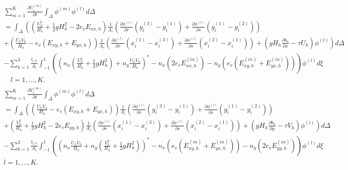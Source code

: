 \documentclass[11pt]{article}
\begin{document}
{\footnotesize
\begin{multline}
\displaystyle\sum_{m=1}^K\frac{\partial U_i^{(m)}}{\partial t}\int_{\Delta}\phi^{(m)}\phi^{(l)} d\Delta \\ = \int_{\Delta}\left(\left(\frac{U_h^2}{H_h} + \frac{1}{2}gH_h^2 - 2e_vE_{xx,h}\right) \frac{1}{A_i}\left(\frac{\partial \phi^{(l)}}{\partial r}\left(y_i^{(3)}-y_i^{(1)}\right) + \frac{\partial \phi^{(l)}}{\partial s}\left(y_i^{(1)}-y_i^{(2)}\right) \right) \right. \\  \left. + \left(\frac{U_hV_h}{H_h} - e_v\left(E_{xy,h} + E_{yx,h}\right) \right) \frac{1}{A_i}\left(\frac{\partial \phi^{(l)}}{\partial r}\left(x_i^{(1)}-x_i^{(3)}\right) + \frac{\partial \phi^{(l)}}{\partial s}\left(x_i^{(2)}-x_i^{(1)}\right) \right) +\left(gH_h\frac{\partial b_h}{\partial x} - \tau U_h \right)\phi^{(l)}\right)d\Delta \\ - \displaystyle\sum_{k=1}^3 \frac{l_{i,k}}{A_i}\int_{-1}^1 \left( \left(n_x\left(\frac{U_h^2}{H_h} + \frac{1}{2}gH_h^2 \right)+ n_y\frac{U_hV_h}{H_h}\right)^*-n_x\left(2e_vE_{xx,h}^{(in)}\right) -n_y\left(e_v\left( E_{xy,h}^{(in)} + E_{yx,h}^{(in)}\right) \right) \right)\phi^{(l)} d\xi   \\ \quad l = 1,\ldots,K.
\end{multline}}
{\footnotesize
\begin{multline}
\displaystyle\sum_{m=1}^K\frac{\partial V_i^{(m)}}{\partial t}\int_{\Delta}\phi^{(m)}\phi^{(l)} d\Delta \\ = \int_{\Delta}\left(\left(\frac{U_hV_h}{H_h}-e_v\left(E_{xy,h} + E_{yx,h} \right)\right) \frac{1}{A_i}\left(\frac{\partial \phi^{(l)}}{\partial r}\left(y_i^{(3)}-y_i^{(1)}\right) + \frac{\partial \phi^{(l)}}{\partial s}\left(y_i^{(1)}-y_i^{(2)}\right) \right)  \right. \\ + \left. \left(\frac{V_h^2}{H_h} + \frac{1}{2}gH_h^2 - 2e_vE_{yy,h} \right)  \frac{1}{A_i}\left(\frac{\partial \phi^{(l)}}{\partial r}\left(x_i^{(1)}-x_i^{(3)}\right) + \frac{\partial \phi^{(l)}}{\partial s}\left(x_i^{(2)}-x_i^{(1)}\right) \right) + \left(gH_h\frac{\partial b_h}{\partial y} - \tau V_h \right)\phi^{(l)} \right)d\Delta \\ - \displaystyle\sum_{k=1}^3 \frac{l_{i,k}}{A_i}\int_{-1}^1 \left( \left(n_x\frac{U_hV_h}{H_h} + n_y\left(\frac{V_h^2}{H_h}+\frac{1}{2}gH_h^2 \right)\right)^*-n_x\left(e_v\left(E_{xy,h}^{(in)} + E_{yx,h}^{(in)} \right) \right) -n_y \left(2e_vE_{yy,h}^{(in)} \right)\right)\phi^{(l)} d\xi   \\  l = 1,\ldots,K.
\end{multline}}
\end{document}
